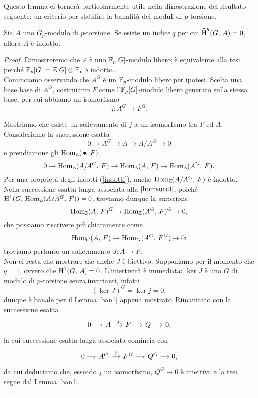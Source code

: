 Questo lemma ci tornerà particolarmente utile nella dimostrazione del risultato seguente: un criterio per stabilire la banalità dei moduli di $ p $-torsione.

\begin{proposition} \label{ban2}
	Sia $ A $ uno $ G_p $-modulo di $ p $-torsione. Se esiste un indice $ q $ per cui $ \operatorname{\widehat{H}}^q(G, \, A) = 0 $, allora $ A $ è indotto.
\end{proposition}

\begin{proof}
	Dimostreremo che $ A $ è uno $ \mathbb{F}_p[G] $-modulo libero; è equivalente alla tesi perché $ \mathbb{F}_p[G] = \mathbb{Z}[G] \otimes \mathbb{F}_p $ è indotto. \\
	
	Cominciamo osservando che $ A^G $ è un $ \mathbb{F}_p $-modulo libero per ipotesi. Scelta una base base di $ A^G $, costruiamo $ F $ come l'$ \mathbb{F}_p[G] $-modulo libero generato sulla stessa base, per cui abbiamo un isomorfismo
	\[ j \colon A^G \to F^G. \]
	
	Mostriamo che esiste un sollevamento di $ j $ a un isomorfismo tra $ F $ ed $ A $. Consideriamo la successione esatta
	\[ 0 \to A^G \to A \to A/A^G \to 0 \]
	e prendiamone gli $ \operatorname{Hom}_{\mathbb{Z}}(\, \bullet, \, F) $
	\begin{equation}\label{homsucc1}
		0 \to \operatorname{Hom}_{\mathbb{Z}}(A/A^G, \, F) \to \operatorname{Hom}_{\mathbb{Z}}(A, \, F) \to \operatorname{Hom}_{\mathbb{Z}}(A^G, \, F).
	\end{equation}
	Per una proprietà degli indotti (\ref{indotti}), anche $ \operatorname{Hom}_{\mathbb{Z}}(A/A^G, \, F) $ è indotto. Nella successione esatta lunga associata alla $ \ref{homsucc1} $, poiché $ \operatorname{H}^1(G, \, \operatorname{Hom}_{\mathbb{Z}}(A/A^G, \, F)) = 0 $, troviamo dunque la suriezione
	\[ \operatorname{Hom}_{\mathbb{Z}}(A, \, F)^G \to \operatorname{Hom}_{\mathbb{Z}}(A^G, \, F)^G \to 0, \]
	che possiamo riscrivere più chiaramente come
	\[ \operatorname{Hom}_G(A, \, F) \to \operatorname{Hom}_G(A^G, \, F^G) \to 0; \]
	troviamo pertanto un sollevamento $ J \colon A \to F $.\\
	
	Non ci resta che mostrare che anche $ J $ è biettivo. Supponiamo per il momento che $ q = 1 $, ovvero che $ \operatorname{H}^1(G, \, A) = 0 $. L'iniettività è immediata: $ \ker J $ è uno $ G $ di modulo di $ p $-torsione senza invarianti, infatti
	\[ (\ker J)^G = \ker j = 0, \]
	dunque è banale per il Lemma \ref{ban1} appena mostrato. Rimaniamo con la successione esatta
	\[ \begin{tikzcd}[column sep = small]
	0 \rar& A \rar["J"]& F \rar& Q \rar& 0,
	\end{tikzcd} \]
	la cui successione esatta lunga associata comincia con
	\[ \begin{tikzcd}[column sep = small]
	0 \rar & A^G \rar["j"] & F^G \rar & Q^G \rar & 0,
	\end{tikzcd} \]
	da cui deduciamo che, essendo $ j $ un isomorfismo, $ Q^G \to 0 $ è iniettiva e la tesi segue dal Lemma \ref{ban1}.\\
	

\end{proof}
